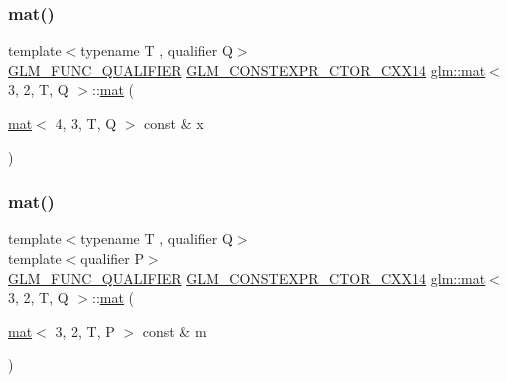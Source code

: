 \mbox{\label{structglm_1_1mat_3_013_00_012_00_01_t_00_01_q_01_4_a6609dd1388669f460272cae28a7e3f59}} 
\subsubsection{\texorpdfstring{mat()}{mat()}\hspace{0.1cm}{\footnotesize\ttfamily [17/21]}}
{\footnotesize\ttfamily template$<$typename T , qualifier Q$>$ \\
\hyperlink{setup_8hpp_a33fdea6f91c5f834105f7415e2a64407}{G\+L\+M\+\_\+\+F\+U\+N\+C\+\_\+\+Q\+U\+A\+L\+I\+F\+I\+ER} \hyperlink{setup_8hpp_a0900f9145e68bf6061b6f5e7be3fa751}{G\+L\+M\+\_\+\+C\+O\+N\+S\+T\+E\+X\+P\+R\+\_\+\+C\+T\+O\+R\+\_\+\+C\+X\+X14} \hyperlink{structglm_1_1mat}{glm\+::mat}$<$ 3, 2, T, Q $>$\+::\hyperlink{structglm_1_1mat}{mat} (\begin{DoxyParamCaption}\item[{\hyperlink{structglm_1_1mat}{mat}$<$ 4, 3, T, Q $>$ const \&}]{x }\end{DoxyParamCaption})}

\mbox{\label{structglm_1_1mat_3_013_00_012_00_01_t_00_01_q_01_4_a0d749576b4014d88c52fe8df4b559333}} 
\subsubsection{\texorpdfstring{mat()}{mat()}\hspace{0.1cm}{\footnotesize\ttfamily [18/21]}}
{\footnotesize\ttfamily template$<$typename T , qualifier Q$>$ \\
template$<$qualifier P$>$ \\
\hyperlink{setup_8hpp_a33fdea6f91c5f834105f7415e2a64407}{G\+L\+M\+\_\+\+F\+U\+N\+C\+\_\+\+Q\+U\+A\+L\+I\+F\+I\+ER} \hyperlink{setup_8hpp_a0900f9145e68bf6061b6f5e7be3fa751}{G\+L\+M\+\_\+\+C\+O\+N\+S\+T\+E\+X\+P\+R\+\_\+\+C\+T\+O\+R\+\_\+\+C\+X\+X14} \hyperlink{structglm_1_1mat}{glm\+::mat}$<$ 3, 2, T, Q $>$\+::\hyperlink{structglm_1_1mat}{mat} (\begin{DoxyParamCaption}\item[{\hyperlink{structglm_1_1mat}{mat}$<$ 3, 2, T, P $>$ const \&}]{m }\end{DoxyParamCaption})}



